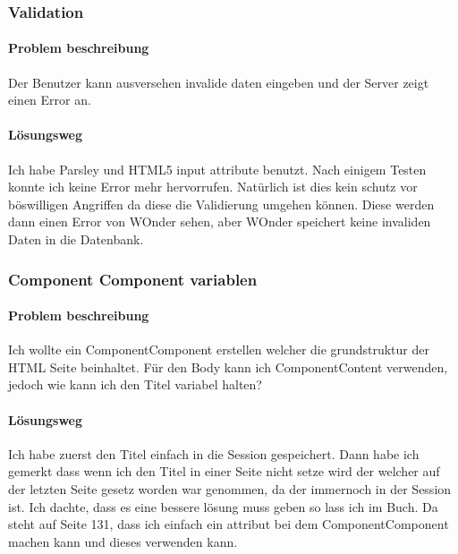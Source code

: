 \documentclass[a4paper, 11pt]{article}
\begin{document}
\subsubsection{Validation}

\paragraph{Problem beschreibung}

Der Benutzer kann ausversehen invalide daten eingeben und der Server zeigt einen Error an.

\paragraph{Lösungsweg}

Ich habe Parsley und HTML5 input attribute benutzt.
Nach einigem Testen konnte ich keine Error mehr hervorrufen.
Natürlich ist dies kein schutz vor böswilligen Angriffen da diese die Validierung umgehen können.
Diese werden dann einen Error von WOnder sehen, aber WOnder speichert keine invaliden Daten in die Datenbank.

\subsubsection{Component Component variablen}

\paragraph{Problem beschreibung}

Ich wollte ein ComponentComponent erstellen welcher die grundstruktur der HTML Seite beinhaltet.
Für den Body kann ich ComponentContent verwenden, jedoch wie kann ich den Titel variabel halten?

\paragraph{Lösungsweg}

Ich habe zuerst den Titel einfach in die Session gespeichert.
Dann habe ich gemerkt dass wenn ich den Titel in einer Seite nicht setze wird der welcher auf der letzten Seite gesetz worden war genommen, da der immernoch in der Session ist.
Ich dachte, dass es eine bessere lösung muss geben so lass ich im Buch\cite{Learning_the_Wonders}.
Da steht auf Seite 131, dass ich einfach ein attribut bei dem ComponentComponent machen kann und dieses verwenden kann.
\end{document}
